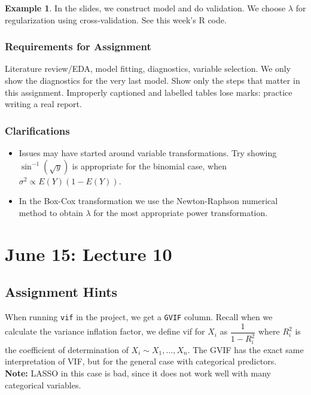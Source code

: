 \documentclass[12pt, a4paper]{article}
\theoremstyle{definition}
\newtheorem{example}{Example}
\newcommand{\lam}{\lambda}
\newcommand{\df}{\dfrac}
\newcommand{\Note}{\textbf{Note: }}
\begin{document}
	\begin{example}
		In the slides, we construct model and do validation. We choose $\lam$ for regularization using cross-validation. See this week's R code.
	\end{example} 

	\subsubsection{Requirements for Assignment}
	Literature review/EDA, model fitting, diagnostics, variable selection. We only show the diagnostics for the very last model. Show only the steps that matter in this assignment. Improperly captioned and labelled tables lose marks: practice writing a real report. 
	
	\subsubsection{Clarifications}
	
	\begin{itemize}
		\item Issues may have started around variable transformations. Try showing $\sin^{-1}(\sqrt{y})$ is appropriate for the binomial case, when $\sigma^2 \propto E(Y)(1-E(Y))$.
		\item In the Box-Cox transformation we use the Newton-Raphson numerical method to obtain $\lambda$ for the most appropriate power transformation.
	\end{itemize}

	\section{June 15: Lecture 10}
	
	\subsection{Assignment Hints}
	
	When running \verb*|vif| in the project, we get a \verb*|GVIF| column. Recall when we calculate the variance inflation factor, we define vif for $X_i$ as $\df{1}{1-R_i^2}$ where $R_i^2$ is the coefficient of determination of $X_i \sim X_1, \ldots, X_n$. The GVIF has the exact same interpretation of VIF, but for the general case with categorical predictors. \\
	
	\Note LASSO in this case is bad, since it does not work well with many categorical variables.
\end{document}
